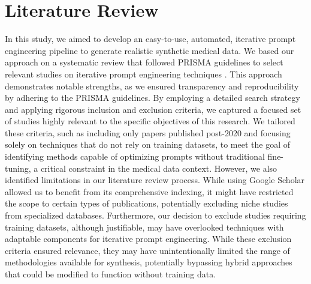 \section{Literature Review}
In this study, we aimed to develop an easy-to-use, automated, iterative prompt engineering pipeline to generate realistic synthetic medical data. We based our approach on a systematic review that followed PRISMA guidelines to select relevant studies on iterative prompt engineering techniques \cite{liberati2009prisma}. This approach demonstrates notable strengths, as we ensured transparency and reproducibility by adhering to the PRISMA guidelines. 
By employing a detailed search strategy and applying rigorous inclusion and exclusion criteria, we captured a focused set of studies highly relevant to the specific objectives of this research.
We tailored these criteria, such as including only papers published post-2020 and focusing solely on techniques that do not rely on training datasets, to meet the goal of identifying methods capable of optimizing prompts without traditional fine-tuning, a critical constraint in the medical data context.
However, we also identified limitations in our literature review process. While using Google Scholar allowed us to benefit from its comprehensive indexing, it might have restricted the scope to certain types of publications, potentially excluding niche studies from specialized databases. Furthermore, our decision to exclude studies requiring training datasets, although justifiable, may have overlooked techniques with adaptable components for iterative prompt engineering. While these exclusion criteria ensured relevance, they may have unintentionally limited the range of methodologies available for synthesis, potentially bypassing hybrid approaches that could be modified to function without training data.